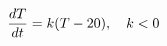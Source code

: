 \documentclass[preview]{standalone}
\begin{document}
\begin{align*}
\special{dvisvgm:raw <g id='unique000'>}\frac{dT}{dt} = k(T - 20), \quad k < 0\special{dvisvgm:raw </g>}
\end{align*}
\end{document}
